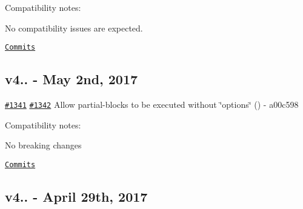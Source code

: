 Compatibility notes\+:
\begin{DoxyItemize}
\item No compatibility issues are expected.
\end{DoxyItemize}

\href{https://github.com/nknapp/handlebars.js/compare/v4.0.8...v4.0.9}{\tt Commits}

\subsection*{v4.. -\/ May 2nd, 2017}


\begin{DoxyItemize}
\item \href{https://github.com/wycats/handlebars.js/issues/1341}{\tt \#1341} \href{https://github.com/wycats/handlebars.js/issues/1342}{\tt \#1342} Allow partial-\/blocks to be executed without \char`\"{}options\char`\"{} (\href{https://github.com/nknapp}{\tt }) -\/ a00c598
\end{DoxyItemize}

Compatibility notes\+:
\begin{DoxyItemize}
\item No breaking changes
\end{DoxyItemize}

\href{https://github.com/nknapp/handlebars.js/compare/v4.0.7...v4.0.8}{\tt Commits}

\subsection*{v4.. -\/ April 29th, 2017}


